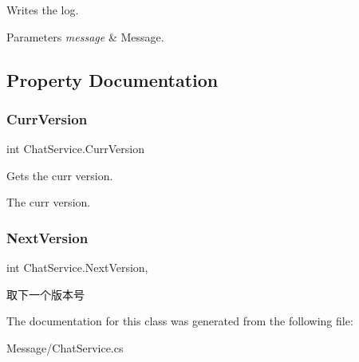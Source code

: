 Writes the log. 


\begin{DoxyParams}{Parameters}
{\em message} & Message.\\
\hline
\end{DoxyParams}


\subsection{Property Documentation}
\mbox{\label{class_chat_service_a1a35e337d470e0a1c4627b778c9f93cd}} 
\subsubsection{\texorpdfstring{Curr\+Version}{CurrVersion}}
{\footnotesize\ttfamily int Chat\+Service.\+Curr\+Version\hspace{0.3cm}{\ttfamily [get]}}



Gets the curr version. 

The curr version.\mbox{\label{class_chat_service_abe3bd1117695ea56843642519c995a5a}} 
\subsubsection{\texorpdfstring{Next\+Version}{NextVersion}}
{\footnotesize\ttfamily int Chat\+Service.\+Next\+Version\hspace{0.3cm}{\ttfamily [static]}, {\ttfamily [get]}}



取下一个版本号 



The documentation for this class was generated from the following file\+:\begin{DoxyCompactItemize}
\item 
Message/Chat\+Service.\+cs\end{DoxyCompactItemize}
